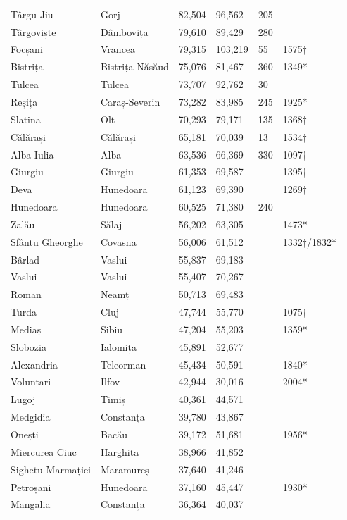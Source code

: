 \documentclass{article}
\begin{document}
\begin{tabular}{llllll}
Târgu Jiu & Gorj & 82,504 & 96,562 & 205 &  \\
Târgoviște & Dâmbovița & 79,610 & 89,429 & 280 &  \\
Focșani & Vrancea & 79,315 & 103,219 & 55 & 1575† \\
Bistrița & Bistrița-Năsăud & 75,076 & 81,467 & 360 & 1349* \\
Tulcea & Tulcea & 73,707 & 92,762 & 30 &  \\
Reșița & Caraș-Severin & 73,282 & 83,985 & 245 & 1925* \\
Slatina & Olt & 70,293 & 79,171 & 135 & 1368† \\
Călărași & Călărași & 65,181 & 70,039 & 13 & 1534† \\
Alba Iulia & Alba & 63,536 & 66,369 & 330 & 1097† \\
Giurgiu & Giurgiu & 61,353 & 69,587 &  & 1395† \\
Deva & Hunedoara & 61,123 & 69,390 &  & 1269† \\
Hunedoara & Hunedoara & 60,525 & 71,380 & 240 &  \\
Zalău & Sălaj & 56,202 & 63,305 &  & 1473* \\
Sfântu Gheorghe & Covasna & 56,006 & 61,512 &  & 1332†/1832* \\
Bârlad & Vaslui & 55,837 & 69,183 &  &  \\
Vaslui & Vaslui & 55,407 & 70,267 &  &  \\
Roman & Neamț & 50,713 & 69,483 &  &  \\
Turda & Cluj & 47,744 & 55,770 &  & 1075† \\
Mediaș & Sibiu & 47,204 & 55,203 &  & 1359* \\
Slobozia & Ialomița & 45,891 & 52,677 &  &  \\
Alexandria & Teleorman & 45,434 & 50,591 &  & 1840* \\
Voluntari & Ilfov & 42,944 & 30,016 &  & 2004* \\
Lugoj & Timiș & 40,361 & 44,571 &  &  \\
Medgidia & Constanța & 39,780 & 43,867 &  &  \\
Onești & Bacău & 39,172 & 51,681 &  & 1956* \\
Miercurea Ciuc & Harghita & 38,966 & 41,852 &  &  \\
Sighetu Marmației & Maramureș & 37,640 & 41,246 &  &  \\
Petroșani & Hunedoara & 37,160 & 45,447 &  & 1930* \\
Mangalia & Constanța & 36,364 & 40,037 &  &  \\

\end{tabular}
\end{document}
